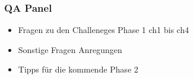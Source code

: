 \documentclass{beamer}
\begin{document}
    \begin{frame}
    \frametitle{QA Panel}
    \begin{itemize}
        \item Fragen zu den Challeneges Phase 1  ch1 bis ch4
        \item Sonstige Fragen Anregungen
        \item Tipps für die kommende Phase 2
    \end{itemize}
    \end{frame}
\end{document}
